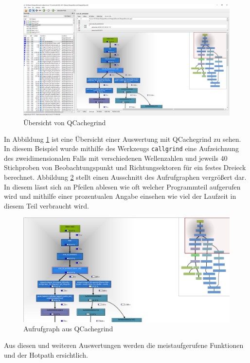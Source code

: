 \begin{figure}
  \includegraphics[width=\textwidth]{images/qcachegrind.png}
  \caption{Übersicht von QCachegrind}\label{qcachegrind}
\end{figure}

In Abbildung \ref{qcachegrind} ist eine Übersicht einer Auswertung mit QCachegrind zu sehen. In diesem Beispiel wurde mithilfe des Werkzeugs \texttt{callgrind} eine Aufzeichnung des zweidimensionalen Falls 
mit verschiedenen Wellenzahlen und jeweils 40 Stichproben von Beobachtungspunkt und Richtungsektoren für ein festes Dreieck berechnet.
Abbildung \ref{qcachegrind_result} stellt einen Ausschnitt des Aufrufgraphen vergrößert dar. In diesem lässt sich an Pfeilen ablesen wie oft welcher Programmteil aufgerufen wird und mithilfe einer prozentualen Angabe einsehen wie viel der Laufzeit in diesem Teil verbraucht wird.

\begin{figure}
  \includegraphics[width=\textwidth]{images/qcachegrind_callgraph.png}
  \caption{Aufrufgraph aus QCachegrind}\label{qcachegrind_result}
\end{figure}

Aus diesen und weiteren Auswertungen werden die meistaufgerufene Funktionen und der Hotpath ersichtlich.

